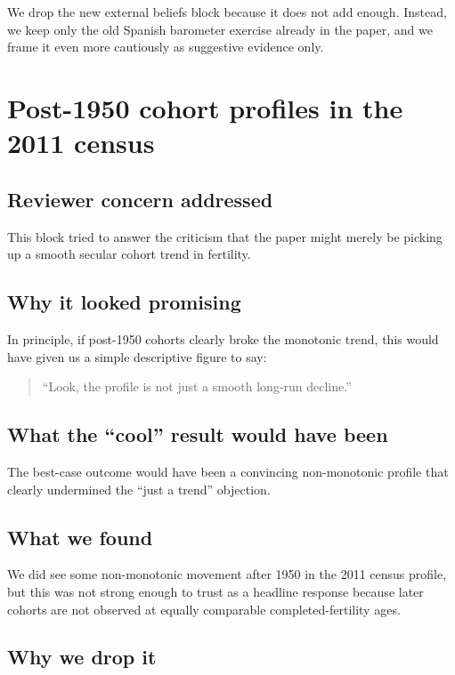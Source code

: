 \documentclass[11pt]{article}
\begin{document}
We drop the new external beliefs block because it does not add enough. Instead, we keep only the old Spanish barometer exercise already in the paper, and we frame it even more cautiously as suggestive evidence only.

\section{Post-1950 cohort profiles in the 2011 census}

\subsection*{Reviewer concern addressed}

This block tried to answer the criticism that the paper might merely be picking up a smooth secular cohort trend in fertility.

\subsection*{Why it looked promising}

In principle, if post-1950 cohorts clearly broke the monotonic trend, this would have given us a simple descriptive figure to say:
\begin{quote}
``Look, the profile is not just a smooth long-run decline.''
\end{quote}

\subsection*{What the ``cool'' result would have been}

The best-case outcome would have been a convincing non-monotonic profile that clearly undermined the ``just a trend'' objection.

\subsection*{What we found}

We did see some non-monotonic movement after 1950 in the 2011 census profile, but this was not strong enough to trust as a headline response because later cohorts are not observed at equally comparable completed-fertility ages.

\subsection*{Why we drop it}
\end{document}
